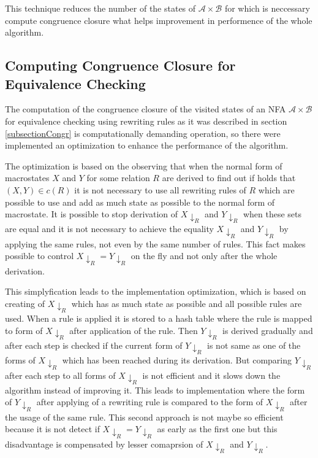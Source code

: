 This technique reduces the number of the states of $\mathcal{A}\times\mathcal{B}$ for which is neccessary compute congruence closure what helps improvement in
performence of the whole algorithm.

\subsection{Computing Congruence Closure for Equivalence Checking}
The computation of the congruence closure of the visited states of an NFA $\mathcal{A}\times\mathcal{B}$ for equivalence checking using rewriting
rules as it was described in section \ref{subsectionCongr} is computationally demanding operation, 
so there were implemented an optimization to enhance the performance of the algorithm.

The optimization is based on the observing that when the normal form of macrostates $X$ and $Y$ for some relation $R$ are derived to find out if holds that
$(X,Y)\in c(R)$ it is not necessary to use all rewriting rules of $R$ which are possible to use and add as much state as possible to the normal form
of macrostate. It is possible to stop derivation of
$X{\downarrow_R}$ and $Y{\downarrow_R}$ when these sets are equal and it is not necessary to achieve the equality $X{\downarrow_R}$ and $Y{\downarrow_R}$ by
applying the same rules, not even by the same number of rules. 
This fact makes possible to control $X{\downarrow_R} = Y{\downarrow_R}$ on the fly and not only after the whole derivation.

This simplyfication leads to the implementation optimization, which is based on creating of $X{\downarrow_R}$ which has as much state as possible and all
possible rules are used. When a rule is applied it is stored to a hash table where the rule is mapped to form of $X{\downarrow_R}$ after application of the rule.
Then $Y{\downarrow_R}$ is derived gradually and after each step is checked if the current form of $Y{\downarrow_R}$ is not same as one of the forms of
$X{\downarrow_R}$ which has been reached during its derivation. But comparing $Y{\downarrow_R}$ after each step to all forms of $X{\downarrow_R}$ is not efficient
and it slows down the algorithm instead of improving it. This leads to implementation where the form of $Y{\downarrow_R}$ after applying of a rewriting rule 
is compared to the form of $X{\downarrow_R}$ after the usage of the same rule. 
This second approach is not maybe so efficient because it is not detect if $X{\downarrow_R}=Y{\downarrow_R}$ as early as the first one but this disadvantage is
compensated by lesser comaprsion of $X{\downarrow_R}$ and $Y{\downarrow_R}$.

